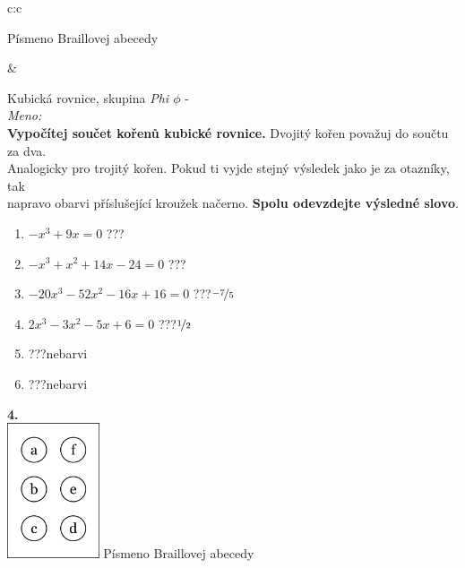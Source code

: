 \documentclass[10pt]{report}
\begin{document}
\begin{tabular}{c:c}
\begin{minipage}[c][99mm][t]{0.49\linewidth}
\begin{center}
\begin{minipage}{0.20\linewidth}
\begin{center}
{\small Písmeno Braillovej abecedy}
\end{center}
\end{minipage}
\end{center}
\end{minipage}
&
\begin{minipage}[c][99mm][t]{0.49\linewidth}
\begin{center}
\vspace{7mm}
{\huge Kubická rovnice, skupina \textit{Phi $\phi$} -}\\[4.5mm]
\textit{Meno:}\phantom{xxxxxxxxxxxxxxxxxxxxxxxxxxxxxxxxxxxxxxxxxxxxxxxxxxxxxxxxxxxxxxxxx}\\[3.5mm]
\textbf{Vypočítej součet kořenů kubické rovnice.} Dvojitý kořen považuj do součtu za dva.\\Analogicky pro trojitý kořen. Pokud ti vyjde stejný výsledek jako je za otazníky, tak\\napravo obarvi příslušející kroužek načerno. \textbf{Spolu odevzdejte výsledné slovo}.\\[3mm]
\begin{minipage}{0.77\linewidth}
\begin{center}
\begin{varwidth}{\textwidth}
\begin{enumerate}
\large
\item $-x^3+9x=0$\quad \dotfill\; ???\;\dotfill {}
\item $-x^3+x^2+14x-24=0$\quad \dotfill\; ???\;\dotfill {}
\item $-20x^3-52x^2-16x+16=0$\quad \dotfill\; ???\;\dotfill \quad $\nicefrac{-7}{5}$
\item $2x^3-3x^2-5x+6=0$\quad \dotfill\; ???\;\dotfill \quad $\nicefrac{1}{2}$
\item \quad \dotfill\; ???\;\dotfill \quad nebarvi
\item \quad \dotfill\; ???\;\dotfill \quad nebarvi
\end{enumerate}
\end{varwidth}
\end{center}
\end{minipage}
\begin{minipage}{0.20\linewidth}
\begin{center}
{\Huge\bfseries 4.} \\[2mm]
\includegraphics[height=40mm]{../images/braille.png}
{\small Písmeno Braillovej abecedy}
\end{center}
\end{minipage}
\end{center}
\end{minipage}

\end{tabular}
\end{document}
